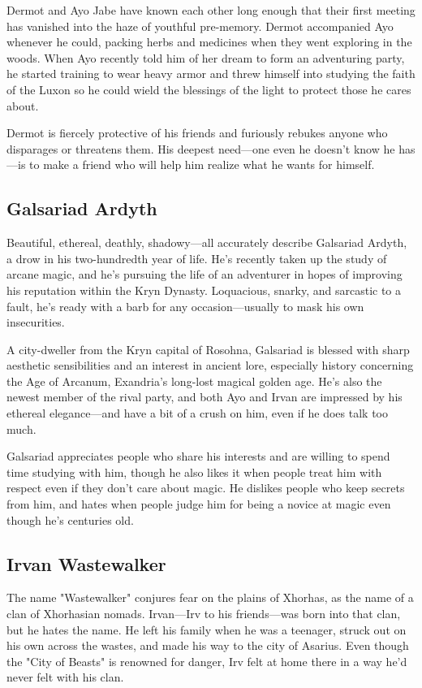 \documentclass[10pt,a4paper,twoside,bg=print,twocolumn,openany,nodeprecatedcode]{dndbook}
\begin{document}
Dermot and Ayo Jabe have known each other long enough that their first meeting has vanished into the haze of youthful pre-memory. Dermot accompanied Ayo whenever he could, packing herbs and medicines when they went exploring in the woods. When Ayo recently told him of her dream to form an adventuring party, he started training to wear heavy armor and threw himself into studying the faith of the Luxon so he could wield the blessings of the light to protect those he cares about.

Dermot is fiercely protective of his friends and furiously rebukes anyone who disparages or threatens them. His deepest need—one even he doesn't know he has—is to make a friend who will help him realize what he wants for himself.

\subsection{Galsariad Ardyth}
Beautiful, ethereal, deathly, shadowy—all accurately describe Galsariad Ardyth, a drow in his two-hundredth year of life. He's recently taken up the study of arcane magic, and he's pursuing the life of an adventurer in hopes of improving his reputation within the Kryn Dynasty. Loquacious, snarky, and sarcastic to a fault, he's ready with a barb for any occasion—usually to mask his own insecurities.

A city-dweller from the Kryn capital of Rosohna, Galsariad is blessed with sharp aesthetic sensibilities and an interest in ancient lore, especially history concerning the Age of Arcanum, Exandria's long-lost magical golden age. He's also the newest member of the rival party, and both Ayo and Irvan are impressed by his ethereal elegance—and have a bit of a crush on him, even if he does talk too much.

Galsariad appreciates people who share his interests and are willing to spend time studying with him, though he also likes it when people treat him with respect even if they don't care about magic. He dislikes people who keep secrets from him, and hates when people judge him for being a novice at magic even though he's centuries old.

\subsection{Irvan Wastewalker}
The name "Wastewalker" conjures fear on the plains of Xhorhas, as the name of a clan of Xhorhasian nomads. Irvan—Irv to his friends—was born into that clan, but he hates the name. He left his family when he was a teenager, struck out on his own across the wastes, and made his way to the city of Asarius. Even though the "City of Beasts" is renowned for danger, Irv felt at home there in a way he'd never felt with his clan.
\end{document}
